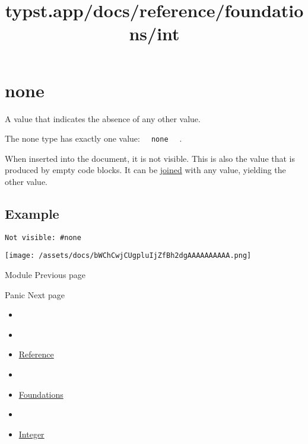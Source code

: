 \section{\texorpdfstring{{ none }}{ none }}\label{summary}

A value that indicates the absence of any other value.

The none type has exactly one value:
\texttt{\ }{\texttt{\ none\ }}\texttt{\ } .

When inserted into the document, it is not visible. This is also the
value that is produced by empty code blocks. It can be
\href{/docs/reference/scripting/\#blocks}{joined} with any value,
yielding the other value.

\subsection{Example}\label{example}

\begin{verbatim}
Not visible: #none
\end{verbatim}

\texttt{[image: /assets/docs/bWChCwjCUgpluIjZfBh2dgAAAAAAAAAA.png]}

\href{/docs/reference/foundations/module/}{\pandocbounded{}}

{ Module } { Previous page }

\href{/docs/reference/foundations/panic/}{\pandocbounded{}}

{ Panic } { Next page }


\title{typst.app/docs/reference/foundations/int}

\begin{itemize}
\tightlist
\item
  \href{/docs}{}
\item
  
\item
  \href{/docs/reference/}{Reference}
\item
  
\item
  \href{/docs/reference/foundations/}{Foundations}
\item
  
\item
  \href{/docs/reference/foundations/int/}{Integer}
\end{itemize}

